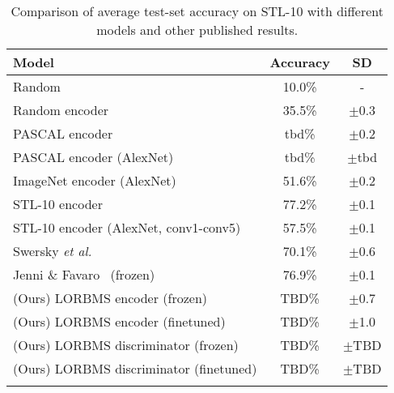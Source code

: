 \documentclass[12pt,a4paper]{article}
\begin{document}
\begin{table}[ht!]
\centering
\begin{tabular}{l|c|c}
\Xhline{0.8pt}
\textbf{Model} & \textbf{Accuracy} & \textbf{SD} \\
\hline
Random & 10.0\% & - \\
Random encoder & 35.5\% & $\pm$0.3 \\ %
PASCAL encoder & tbd\% & $\pm$0.2  \\ %
PASCAL encoder (AlexNet) & tbd\% & $\pm$tbd  \\
ImageNet encoder (AlexNet) & 51.6\% & $\pm$0.2  \\ %
STL-10 encoder & 77.2\% & $\pm$0.1 \\ %
STL-10 encoder (AlexNet, conv1-conv5) & 57.5\% & $\pm$0.1 \\ %
\hline
Swersky \textit{et al.}~\cite{Stl10TlExp2Comp} & 70.1\% & $\pm$0.6 \\
Jenni \& Favaro~\cite{SpotArtifacts} (frozen) & 76.9\% & $\pm$0.1 \\
\hline
(Ours) LORBMS encoder (frozen) & TBD\%  & $\pm$0.7  \\
(Ours) LORBMS encoder (finetuned) & TBD\% & $\pm$1.0  \\
(Ours) LORBMS discriminator (frozen) & TBD\%  & $\pm$TBD  \\
(Ours) LORBMS discriminator (finetuned) & TBD\%  & $\pm$TBD  \\
\Xhline{0.8pt}
\end{tabular}
\caption{Comparison of average test-set accuracy on STL-10 with different models and other published results.} \label{tab:comparison_stl10}
\end{table}
\end{document}

